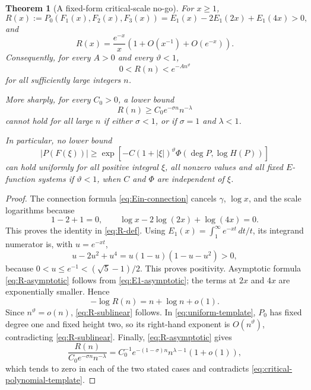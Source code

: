 \documentclass[11pt]{article}
\theoremstyle{keio}
\newtheorem{theorem}{Theorem}[section]
\theoremstyle{definition}
\theoremstyle{remark}
\begin{document}
\begin{theorem}[A fixed-form critical-scale no-go]
\label{thm:sublinear-no-go}
For \(x\ge1\),
\begin{equation}\label{eq:R-def}
 R(x):=P_0(F_1(x),F_2(x),F_3(x))
 =E_1(x)-2E_1(2x)+E_1(4x)>0,
\end{equation}
and
\begin{equation}\label{eq:R-asymptotic}
 R(x)=\frac{e^{-x}}x
 \left(1+O(x^{-1})+O(e^{-x})\right).
\end{equation}
Consequently, for every \(A>0\) and every \(\vartheta<1\),
\begin{equation}\label{eq:R-sublinear}
 0<R(n)<e^{-An^\vartheta}
\end{equation}
for all sufficiently large integers \(n\).

More sharply, for every \(C_0>0\), a lower bound
\begin{equation}\label{eq:critical-polynomial-template}
 R(n)\ge C_0e^{-\sigma n}n^{-\lambda}
\end{equation}
cannot hold for all large \(n\) if either \(\sigma<1\), or if
\(\sigma=1\) and \(\lambda<1\).

In particular, no lower bound
\begin{equation}\label{eq:uniform-template}
 |P(F(\xi))|\ge
 \exp\!\left[-C(1+|\xi|)^\vartheta
 \Phi(\deg P,\log H(P))\right]
\end{equation}
can hold uniformly for all positive integral \(\xi\), all nonzero values and
all fixed \(E\)-function systems if \(\vartheta<1\), when \(C\) and \(\Phi\)
are independent of \(\xi\).
\end{theorem}

\begin{proof}
The connection formula \eqref{eq:Ein-connection} cancels \(\gamma\),
\(\log x\), and the scale logarithms because
\[
 1-2+1=0,
 \qquad
 \log x-2\log(2x)+\log(4x)=0.
\]
This proves the identity in \eqref{eq:R-def}.  Using
\(E_1(x)=\int_1^\infty e^{-xt}\,dt/t\), its integrand numerator is, with
\(u=e^{-xt}\),
\[
 u-2u^2+u^4=u(1-u)(1-u-u^2)>0,
\]
because \(0<u\le e^{-1}<(\sqrt5-1)/2\).  This proves positivity.
Asymptotic formula \eqref{eq:R-asymptotic} follows from
\eqref{eq:E1-asymptotic}; the terms at \(2x\) and \(4x\) are exponentially
smaller.  Hence
\[
 -\log R(n)=n+\log n+o(1).
\]
Since \(n^\vartheta=o(n)\), \eqref{eq:R-sublinear} follows.  In
\eqref{eq:uniform-template}, \(P_0\) has fixed degree one and fixed height
two, so its right-hand exponent is \(O(n^\vartheta)\), contradicting
\eqref{eq:R-sublinear}.
Finally, \eqref{eq:R-asymptotic} gives
\[
 \frac{R(n)}{C_0e^{-\sigma n}n^{-\lambda}}
 =C_0^{-1}e^{-(1-\sigma)n}n^{\lambda-1}(1+o(1)),
\]
which tends to zero in each of the two stated cases and contradicts
\eqref{eq:critical-polynomial-template}.
\end{proof}
\end{document}
